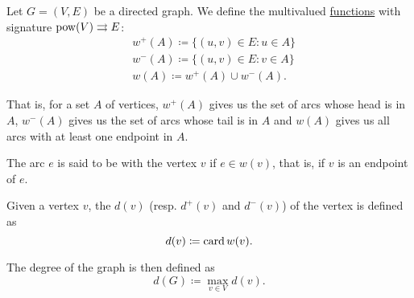 \begin{definition}\label{def:graph_incidence}
  Let \( G = (V, E) \) be a directed graph. We define the multivalued \hyperref[def:function/multivalued]{functions} with signature \( \operatorname{pow}(V) \rightrightarrows E \):
  \begin{align*}
    &w^+(A) \coloneqq \{ (u, v) \in E \colon u \in A \} \\
    &w^-(A) \coloneqq \{ (u, v) \in E \colon v \in A \} \\
    &w(A) \coloneqq w^+(A) \cup w^-(A).
  \end{align*}

  That is, for a set \( A \) of vertices, \( w^+(A) \) gives us the set of arcs whose head is in \( A \), \( w^-(A) \) gives us the set of arcs whose tail is in \( A \) and \( w(A) \) gives us all arcs with at least one endpoint in \( A \).

  \begin{defenum}
     The arc \( e \) is said to be  with the vertex \( v \) if \( e \in w(v) \), that is, if \( v \) is an endpoint of \( e \).

    \cite[chapter 1, section 1.4]{Gondran1984} Given a vertex \( v \), the  \( d(v) \) (resp.  \( d^+(v) \) and  \( d^-(v) \)) of the vertex is defined as
    \begin{equation*}
      d(v) \coloneqq \operatorname{card} w(v).
    \end{equation*}

    The degree of the graph is then defined as
    \begin{equation*}
      d(G) \coloneqq \max_{v \in V} d(v).
    \end{equation*}
  \end{defenum}
\end{definition}

